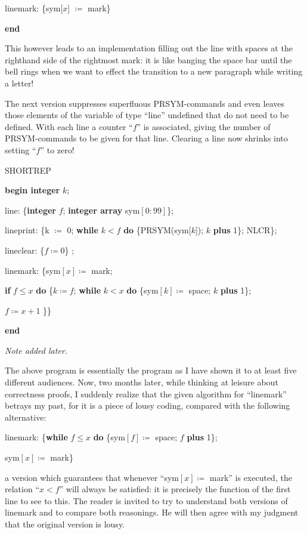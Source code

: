 \noindent
\quad linemark: \{sym[$x$] $\coloneq$ mark\}

\noindent
\textbf{end}

This however leads to an implementation filling out the line with spaces at the righthand side of the rightmost mark: it is like banging the space bar until the bell rings when we want to effect the transition to a new paragraph while writing a letter!

The next version suppresses superfluous PRSYM-commands and even leaves those elements of the variable of type ``line'' undefined that do not need to be defined. With each line a counter ``$f$'' is associated, giving the number of PRSYM-commands to be given for that line. Clearing a line now shrinks into setting ``$f$'' to zero!

\noindent
SHORTREP

\noindent
\textbf{begin integer} $k$;

\noindent
\quad line: \{\textbf{integer} $f$; \textbf{integer array} sym$[0 : 99]$\};

\noindent
\quad lineprint: \{k $\coloneq$ 0; \textbf{while} $k < f$ \textbf{do} \{PRSYM(sym[$k$]); $k$ \textbf{plus} 1\}; NLCR\};

\noindent
\quad lineclear: \{$f \coloneq 0$\} ;

\noindent
\quad linemark: \{sym$[x] \coloneq$ mark;

\noindent
\quad \textbf{if} $f \leqslant x$ \textbf{do} \{$k \coloneq f$; \textbf{while} $k < x$ \textbf{do} \{sym$[k] \coloneq$ space; $k$ \textbf{plus} 1\};

\noindent
\quad \quad $f \coloneq x + 1$ \}\}

\noindent
\textbf{end}

\noindent
\textit{Note added later.}

The above program is essentially the program as I have shown it to at least five different audiences. Now, two months later, while thinking at leisure about correctness proofs, I suddenly realize that the given algorithm for ``linemark'' betrays my past, for it is a piece of lousy coding, compared with the following alternative:

linemark: \{\textbf{while} $f \leqslant x$ \textbf{do} \{sym$[f] \coloneq$ space; $f$ \textbf{plus} 1\};
	
\quad sym$[x] \coloneq$ mark\}

\noindent
a version which guarantees that whenever ``sym$[x] \coloneq$ mark'' is executed, the relation ``$x < f$'' will always be satisfied: it is precisely the function of the first line to see to this. The reader is invited to try to understand both versions of linemark and to compare both reasonings. He will then agree with my judgment that the original version is lousy.

